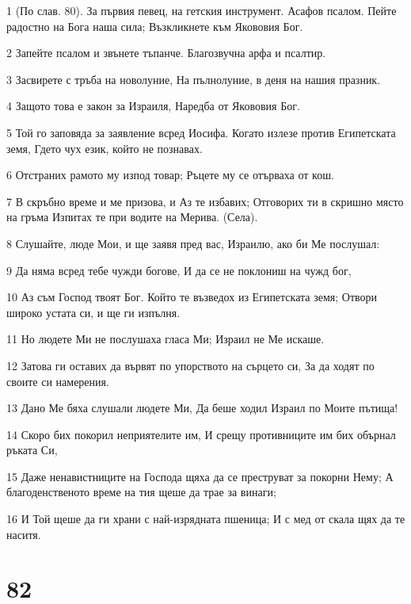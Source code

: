 \par 1 (По слав. 80). За първия певец, на гетския инструмент. Асафов псалом. Пейте радостно на Бога наша сила; Възкликнете към Якововия Бог.
\par 2 Запейте псалом и звънете тъпанче. Благозвучна арфа и псалтир.
\par 3 Засвирете с тръба на новолуние, На пълнолуние, в деня на нашия празник.
\par 4 Защото това е закон за Израиля, Наредба от Якововия Бог.
\par 5 Той го заповяда за заявление всред Иосифа. Когато излезе против Египетската земя, Гдето чух език, който не познавах.
\par 6 Отстраних рамото му изпод товар; Ръцете му се отърваха от кош.
\par 7 В скръбно време и ме призова, и Аз те избавих; Отговорих ти в скришно място на гръма Изпитах те при водите на Мерива. (Села).
\par 8 Слушайте, люде Мои, и ще заявя пред вас, Израилю, ако би Ме послушал:
\par 9 Да няма всред тебе чужди богове, И да се не поклониш на чужд бог,
\par 10 Аз съм Господ твоят Бог. Който те възведох из Египетската земя; Отвори широко устата си, и ще ги изпълня.
\par 11 Но людете Ми не послушаха гласа Ми; Израил не Ме искаше.
\par 12 Затова ги оставих да вървят по упорството на сърцето си, За да ходят по своите си намерения.
\par 13 Дано Ме бяха слушали людете Ми, Да беше ходил Израил по Моите пътища!
\par 14 Скоро бих покорил неприятелите им, И срещу противниците им бих обърнал ръката Си,
\par 15 Даже ненавистниците на Господа щяха да се преструват за покорни Нему; А благоденственото време на тия щеше да трае за винаги;
\par 16 И Той щеше да ги храни с най-изрядната пшеница; И с мед от скала щях да те наситя.

\chapter{82}

